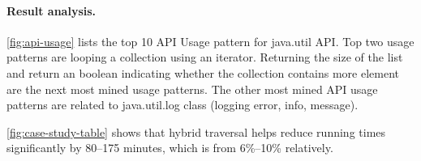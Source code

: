 \paragraph{Result analysis.} \autoref{fig:api-usage} lists the top 10 API Usage pattern for java.util API. Top two usage patterns are looping a collection using an iterator. Returning the size of the list and return an boolean indicating whether the collection contains more element are the next most mined usage patterns. The other most mined API usage patterns are related to java.util.log class (logging error, info, message).

\autoref{fig:case-study-table} shows that hybrid traversal helps reduce 
running times significantly by 80--175 minutes, which is from 6\%--10\% relatively. 

%
%
